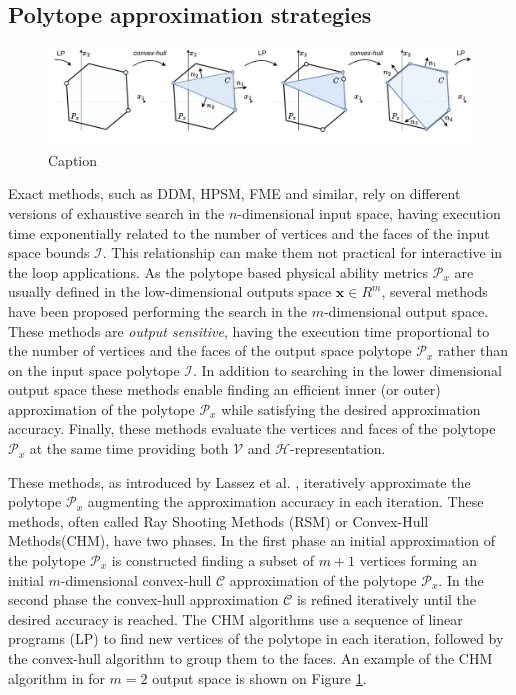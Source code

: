 \subsection{Polytope approximation strategies}
\label{ch:approximation_algos}
 
\begin{figure}[!htb]
    \centering
    \includegraphics[width=\linewidth]{Chapters/imgs/ray_shooting.pdf}
    \caption{Caption}
    \label{fig:rsm}
\end{figure}

Exact methods, such as DDM, HPSM, FME and similar, rely on different versions of exhaustive search in the $n$-dimensional input space, having execution time exponentially related to the number of vertices and the faces of the input space bounds $\mathcal{I}$. This relationship can make them not practical for interactive in the loop applications. As the polytope based physical ability metrics $\mathcal{P}_x$ are usually defined in the low-dimensional outputs space $\bm{x}\in R^m$, several methods have been proposed performing the search in the $m$-dimensional output space. These methods are \textit{output sensitive}, having the execution time proportional to the number of vertices and the faces of the output space polytope $\mathcal{P}_x$ rather than on the input space polytope $\mathcal{I}$. 
In addition to searching in the lower dimensional output space these methods enable finding an efficient inner (or outer) approximation of the polytope $\mathcal{P}_x$ while satisfying the desired approximation accuracy. Finally, these methods evaluate the vertices and faces of the polytope $\mathcal{P}_x$ at the same time providing both $\mathcal{V}$ and $\mathcal{H}$-representation.

These methods, as introduced by Lassez et al. \cite{lassez1992quantifier, Huynh2005PracticalIO}, iteratively approximate the polytope $\mathcal{P}_x$ augmenting the approximation accuracy in each iteration. These methods, often called Ray Shooting Methods (RSM) or Convex-Hull Methods(CHM), have two phases. In the first phase an initial approximation of the polytope $\mathcal{P}_x$ is constructed finding a subset of $m+1$ vertices forming an initial $m$-dimensional convex-hull $\mathcal{C}$ approximation of the polytope $\mathcal{P}_x$. In the second phase the convex-hull approximation $\mathcal{C}$ is refined iteratively until the desired accuracy is reached. The CHM algorithms use a sequence of linear programs (LP) to find new vertices of the polytope in each iteration, followed by the convex-hull algorithm to group them to the faces. An example of the CHM algorithm in for $m=2$ output space is shown on Figure \ref{fig:rsm}.   

